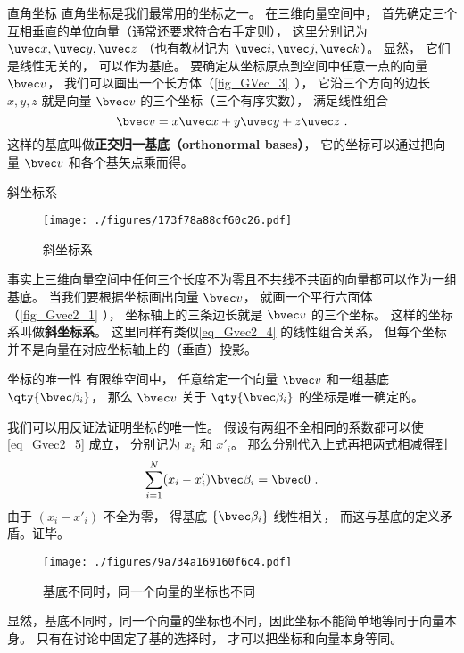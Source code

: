 \begin{example}{直角坐标}\label{ex_Gvec2_2}
直角坐标是我们最常用的坐标之一。 在三维向量空间中， 首先确定三个互相垂直的单位向量（通常还要求符合右手定则）， 这里分别记为 $\uvec x, \uvec y, \uvec z$ （也有教材记为 $\uvec i, \uvec j, \uvec k$）。 显然， 它们是线性无关的， 可以作为基底。 要确定从坐标原点到空间中任意一点的向量 $\bvec v$， 我们可以画出一个长方体（\autoref{fig_GVec_3}~）， 它沿三个方向的边长 $x, y, z$ 就是向量 $\bvec v$ 的三个坐标（三个有序实数）， 满足线性组合
\begin{equation}\label{eq_Gvec2_4}
\bvec v = x\uvec x + y\uvec y + z\uvec z~.
\end{equation}
这样的基底叫做\textbf{正交归一基底（orthonormal bases）}， 它的坐标可以通过把向量 $\bvec v$ 和各个基矢点乘而得。
\end{example}

\begin{example}{斜坐标系}\label{ex_Gvec2_1}
\begin{figure}[ht]
\centering
\texttt{[image: ./figures/173f78a88cf60c26.pdf]}
\caption{斜坐标系} \label{fig_Gvec2_1}
\end{figure}
事实上三维向量空间中任何三个长度不为零且不共线不共面的向量都可以作为一组基底。 当我们要根据坐标画出向量 $\bvec v$， 就画一个平行六面体（\autoref{fig_Gvec2_1} ）， 坐标轴上的三条边长就是 $\bvec v$ 的三个坐标。 这样的坐标系叫做\textbf{斜坐标系}。 这里同样有类似\autoref{eq_Gvec2_4} 的线性组合关系， 但每个坐标并不是向量在对应坐标轴上的（垂直）投影。
\end{example}

\begin{theorem}{坐标的唯一性}
有限维空间中， 任意给定一个向量 $\bvec v$ 和一组基底 $\qty{\bvec \beta_i}$， 那么 $\bvec v$ 关于 $\qty{\bvec \beta_i}$ 的坐标是唯一确定的。
\end{theorem}
我们可以用反证法证明坐标的唯一性。 假设有两组不全相同的系数都可以使\autoref{eq_Gvec2_5} 成立， 分别记为 $x_i$ 和 $x'_i$。 那么分别代入上式再把两式相减得到
\begin{equation}
\sum_{i=1}^N (x_i-x'_i) \bvec \beta_i = \bvec 0~.
\end{equation}
由于 $(x_i-x'_i)$ 不全为零， 得基底 $\{\bvec \beta_i\}$ 线性相关， 而这与基底的定义矛盾。证毕。
\begin{figure}[ht]
\centering
\texttt{[image: ./figures/9a734a169160f6c4.pdf]}
\caption{基底不同时，同一个向量的坐标也不同} \label{fig_Gvec2_2}
\end{figure}
显然，基底不同时，同一个向量的坐标也不同，因此坐标不能简单地等同于向量本身。 只有在讨论中固定了基的选择时， 才可以把坐标和向量本身等同。

